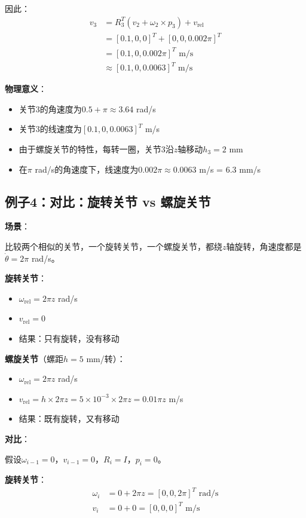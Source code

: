 \documentclass[12pt,a4paper]{article}
\begin{document}
因此：
\begin{align}
v_3 &= R_3^T (v_2 + \omega_2 \times p_3) + v_{\text{rel}} \\
&= [0.1, 0, 0]^T + [0, 0, 0.002\pi]^T \\
&= [0.1, 0, 0.002\pi]^T \text{ m/s} \\
&\approx [0.1, 0, 0.0063]^T \text{ m/s}
\end{align}

\textbf{物理意义}：
\begin{itemize}
\item 关节3的角速度为$0.5 + \pi \approx 3.64$ rad/s
\item 关节3的线速度为$[0.1, 0, 0.0063]^T$ m/s
\item 由于螺旋关节的特性，每转一圈，关节3沿$z$轴移动$h_3 = 2$ mm
\item 在$\pi$ rad/s的角速度下，线速度为$0.002\pi \approx 0.0063$ m/s = 6.3 mm/s
\end{itemize}

\subsection{例子4：对比：旋转关节 vs 螺旋关节}

\textbf{场景}：

比较两个相似的关节，一个旋转关节，一个螺旋关节，都绕$z$轴旋转，角速度都是$\dot{\theta} = 2\pi$ rad/s。

\textbf{旋转关节}：
\begin{itemize}
\item $\omega_{\text{rel}} = 2\pi z$ rad/s
\item $v_{\text{rel}} = 0$
\item 结果：只有旋转，没有移动
\end{itemize}

\textbf{螺旋关节}（螺距$h = 5$ mm/转）：
\begin{itemize}
\item $\omega_{\text{rel}} = 2\pi z$ rad/s
\item $v_{\text{rel}} = h \times 2\pi z = 5 \times 10^{-3} \times 2\pi z = 0.01\pi z$ m/s
\item 结果：既有旋转，又有移动
\end{itemize}

\textbf{对比}：

假设$\omega_{i-1} = 0$，$v_{i-1} = 0$，$R_i = I$，$p_i = 0$。

\textbf{旋转关节}：
\begin{align}
\omega_i &= 0 + 2\pi z = [0, 0, 2\pi]^T \text{ rad/s} \\
v_i &= 0 + 0 = [0, 0, 0]^T \text{ m/s}
\end{align}
\end{document}
